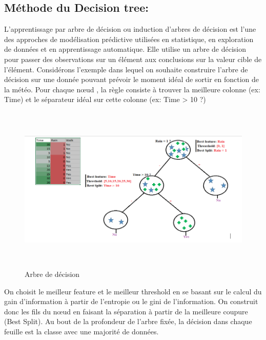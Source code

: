 \subsection{Méthode du Decision tree:}
L'apprentissage par arbre de décision ou induction d'arbres de décision est l'une des approches de modélisation prédictive utilisées en statistique, en exploration de données et en apprentissage automatique. Elle utilise un arbre de décision pour passer des observations sur un élément aux conclusions sur la valeur cible de l'élément.
Considérons l’exemple dans lequel on souhaite construire l’arbre de décision sur une donnée pouvant prévoir le moment idéal de sortir en fonction de la météo. Pour chaque nœud , la règle consiste à trouver la meilleure colonne (ex: Time) et le séparateur idéal sur cette colonne (ex: Time > 10 ?)\\
\begin{figure}[h]
\begin{center}
\includegraphics[width=15cm,height=8cm]{images/decision_tree_formular.png}
\caption[Arbre de décision]{Arbre de décision}
\label{monlabel}
\end{center}
\end{figure}
On choisit le meilleur feature et le meilleur threshold en se basant sur le calcul du gain d’information à partir de l’entropie ou le gini de l’information. On construit donc les fils du nœud en faisant la séparation à partir de la meilleure coupure (Best Split). Au bout de la profondeur de l’arbre fixée, la décision dans chaque feuille est la classe avec une majorité de données.
\newpage
